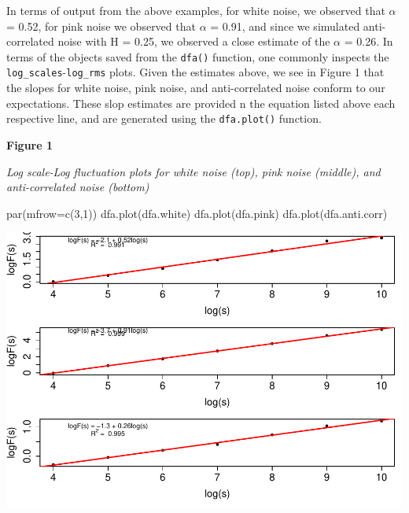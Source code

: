 \documentclass[
  man]{apa6}
\newenvironment{Shaded}{\begin{snugshade}}{\end{snugshade}}
\newcommand{\AttributeTok}[1]{\textcolor[rgb]{0.77,0.63,0.00}{#1}}
\newcommand{\DecValTok}[1]{\textcolor[rgb]{0.00,0.00,0.81}{#1}}
\newcommand{\FunctionTok}[1]{\textcolor[rgb]{0.00,0.00,0.00}{#1}}
\newcommand{\NormalTok}[1]{#1}
\begin{document}
In terms of output from the above examples, for white noise, we observed
that \(\alpha\) = 0.52, for pink noise we observed that
\(\alpha\) = 0.91, and since we simulated anti-correlated
noise with H = 0.25, we observed a close estimate of the \(\alpha\) =
0.26. In terms of the objects saved from the \texttt{dfa()}
function, one commonly inspects the \texttt{log\_scales}-\texttt{log\_rms} plots. Given
the estimates above, we see in Figure 1 that the slopes for white noise,
pink noise, and anti-correlated noise conform to our expectations. These
slop estimates are provided n the equation listed above each respective
line, and are generated using the \texttt{dfa.plot()} function.

\textbf{Figure 1}

\emph{Log scale-Log fluctuation plots for white noise (top), pink noise
(middle), and anti-correlated noise (bottom)}

\begin{Shaded}
\begin{Highlighting}[]
\FunctionTok{par}\NormalTok{(}\AttributeTok{mfrow=}\FunctionTok{c}\NormalTok{(}\DecValTok{3}\NormalTok{,}\DecValTok{1}\NormalTok{))}
\FunctionTok{dfa.plot}\NormalTok{(dfa.white)}
\FunctionTok{dfa.plot}\NormalTok{(dfa.pink)}
\FunctionTok{dfa.plot}\NormalTok{(dfa.anti.corr)}
\end{Highlighting}
\end{Shaded}

\includegraphics{fractal_regression_paper_brm_files/figure-latex/unnamed-chunk-3-1.pdf}
\end{document}
